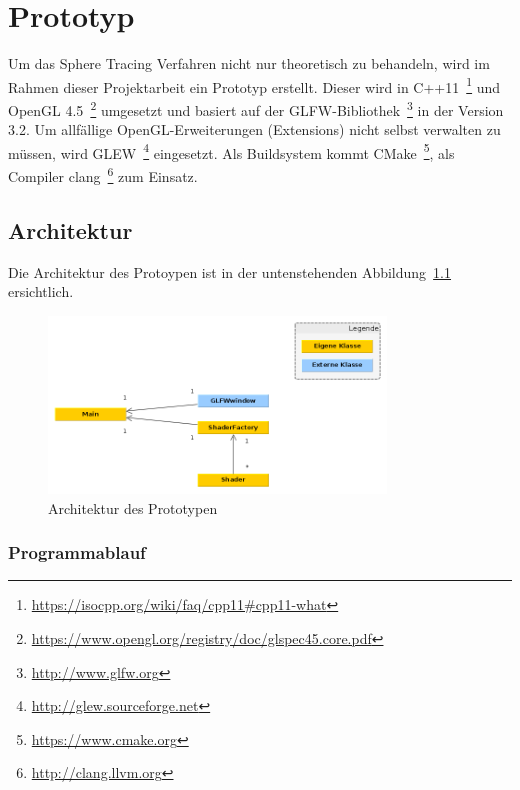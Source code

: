 
\chapter{Prototyp}
\label{chap:prototype}

Um das Sphere Tracing Verfahren nicht nur theoretisch zu behandeln, wird
im Rahmen dieser Projektarbeit ein Prototyp erstellt. Dieser wird in
C++11~\footnote{\url{https://isocpp.org/wiki/faq/cpp11\#cpp11-what}} und
OpenGL
4.5~\footnote{\url{https://www.opengl.org/registry/doc/glspec45.core.pdf}}
umgesetzt und basiert auf der
GLFW-Bibliothek~\footnote{\url{http://www.glfw.org}} in der Version 3.2.
Um allfällige OpenGL-Erweiterungen (Extensions) nicht selbst verwalten
zu müssen, wird GLEW~\footnote{\url{http://glew.sourceforge.net}}
eingesetzt. Als Buildsystem kommt
CMake~\footnote{\url{https://www.cmake.org}}, als Compiler
clang~\footnote{\url{http://clang.llvm.org}} zum Einsatz.

\section{Architektur}
\label{sec:architecture}

Die Architektur des Protoypen ist in der untenstehenden
Abbildung~\ref{fig:prototype_architecture} ersichtlich.

\begin{figure}[H]
    \centering
    \includegraphics[width=0.8\textwidth]{img/prototype_class_diagram.png}
    \caption{Architektur des Prototypen\protect\footnotemark}\label{fig:prototype_architecture}
\end{figure}

\subsection{Programmablauf}
\label{subsec:program_sequence}

